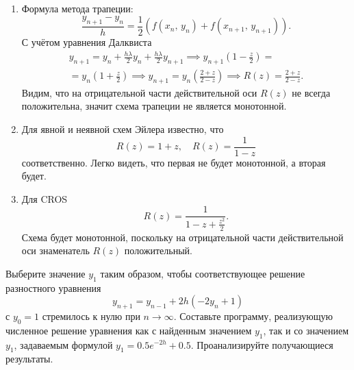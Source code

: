 \documentclass[a4paper]{article}
\begin{document}
\begin{sol}
\renewcommand{\labelenumi}{\asbuk{enumi})}
\begin{enumerate}
\item Формула метода трапеции:
	\[
	\frac{y_{n+1}-y_n}{h}=\frac{1}{2}
	\left( f(x_n,\,y_n)+
	f(x_{n+1},\,y_{n+1})\right) 
	.\] 
	С учётом уравнения Далквиста
	\begin{multline*}
	y_{n+1}=y_n+\frac{h\lambda}{2}y_n+
	\frac{h\lambda}{2}y_{n+1}\implies
	y_{n+1}\left( 1-\frac{z}{2} \right) =\\=
	y_n \left( 1+\frac{z}{2} \right) \implies
	y_{n+1}=y_n \left( 
	\frac{2+z}{2-z}\right) \implies
	R(z)=\frac{2+z}{2-z}
	.\end{multline*} 
	Видим, что на отрицательной части
	действительной оси $R(z)$ не
	всегда положительна, значит
	схема трапеции не 
	является монотонной.
\item Для явной и неявной схем Эйлера известно, что
	 \[
		 R(z)=1+z,\quad R(z)=\frac{1}{1-z}
	\]
	соответственно. Легко видеть, что
	первая  не будет монотонной, а
	вторая будет.
\item Для CROS
	 \[
		 R(z)= \frac{1}{1-z+\frac{z^2}{2}}
	.\] 
	Схема будет монотонной, поскольку на
	отрицательной части действительной оси
	знаменатель $R(z)$ положительный.
\end{enumerate}
\end{sol}
\begin{hiProb}[8.8]
Выберите значение $y_1$ таким образом, чтобы
соответствующее решение разностного уравнения
\[
	y_{n+1}=y_{n-1}+2h(-2y_n+1)
\]
с $y_0=1$ стремилось к нулю при $n\to \infty$. Составьте
программу, реализующую численное решение уравнения
как с найденным значением $y_1$, так и со значением
$y_1$, задаваемым формулой $y_1=0.5 e^{-2h}+0.5$.
Проанализируйте получающиеся результаты.
\end{hiProb}
\end{document}
